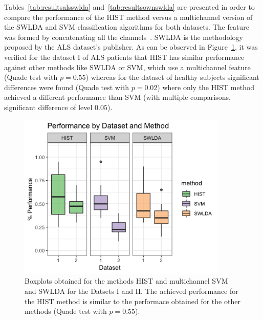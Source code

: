 
Tables~\ref{tab:resultsalsswlda} and~\ref{tab:resultsownswlda} are presented in order to compare the performance of the HIST method versus a multichannel version of the SWLDA and SVM classification algorithms for both datasets.  The feature was formed by concatenating all the channels~\cite{Krusienski2006}.  SWLDA is the methodology proposed by the ALS dataset's publisher.  As can be observed in Figure~\ref{fig:boxplots}, it was verified for the dataset I of ALS patients that HIST has similar performance  against other methods like SWLDA or SVM, which use a multichannel feature (Quade test with $p=0.55$) whereas for the dataset of healthy subjects significant differences were found (Quade test with $p=0.02$) where only the HIST method achieved a different performance than SVM (with multiple comparisons, significant difference of level $0.05$).

\begin{figure}[h!]
\centering
\includegraphics[width=10cm]{images/boxplots.png}
\caption[Dataset I and II Performances Boxplots]{Boxplots obtained for the methods HIST and multichannel SVM and SWLDA for the Datsets I and II.  The achieved performance for the HIST method is similar to the performace obtained for the other methods (Quade test with $p=0.55$).}
\label{fig:boxplots}
\end{figure}

